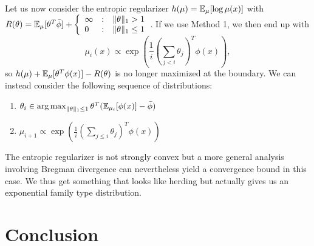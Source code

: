 \documentclass{article}
\begin{document}
Let us now consider the entropic regularizer $h(\mu) = \mathbb{E}_{\mu}[\log \mu(x)]$ with $R(\theta) = \mathbb{E}_{\mu}[\theta^T\bar{\phi}] + \left\{ \begin{array}{llc} \infty & : & \|\theta\|_1 > 1 \\ 0 & : & \|\theta\|_1 \leq 1 \end{array} \right.$.
If we use Method 1, we then end up with 
\[ \mu_i(x) \propto \exp(\frac{1}{i}(\sum_{j<i} \theta_j)^T\phi(x)), \]
so $h(\mu) + \mathbb{E}_{\mu}[\theta^T\phi(x)] - R(\theta)$ is no longer maximized at the 
boundary. We can instead consider the following sequence of distributions:
\begin{enumerate}
\item $\theta_i \in \argmax_{\|\theta\|_1 \leq 1} \theta^T (\bE_{\mu_i}[\phi(x)]-\bar{\phi})$
\item $\mu_{i+1} \propto \exp(\frac{1}{i}(\sum_{j \leq i} \theta_j)^T\phi(x))$
\end{enumerate}
The entropic regularizer is not strongly convex but a more general analysis involving 
Bregman divergence can nevertheless yield a convergence bound in this case. We thus 
get something that looks like herding but actually gives us an exponential family 
type distribution.

\section{Conclusion}
\label{sec:conclusion}

%
%
\end{document}
